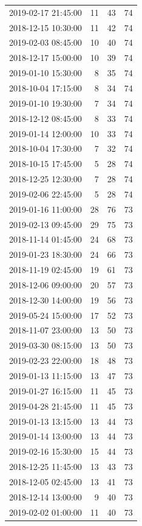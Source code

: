 \begin{tabular}{lrrr}
2019-02-17 21:45:00 & 11 & 43 & 74 \\
2018-12-15 10:30:00 & 11 & 42 & 74 \\
2019-02-03 08:45:00 & 10 & 40 & 74 \\
2018-12-17 15:00:00 & 10 & 39 & 74 \\
2019-01-10 15:30:00 & 8 & 35 & 74 \\
2018-10-04 17:15:00 & 8 & 34 & 74 \\
2019-01-10 19:30:00 & 7 & 34 & 74 \\
2018-12-12 08:45:00 & 8 & 33 & 74 \\
2019-01-14 12:00:00 & 10 & 33 & 74 \\
2018-10-04 17:30:00 & 7 & 32 & 74 \\
2018-10-15 17:45:00 & 5 & 28 & 74 \\
2018-12-25 12:30:00 & 7 & 28 & 74 \\
2019-02-06 22:45:00 & 5 & 28 & 74 \\
2019-01-16 11:00:00 & 28 & 76 & 73 \\
2019-02-13 09:45:00 & 29 & 75 & 73 \\
2018-11-14 01:45:00 & 24 & 68 & 73 \\
2019-01-23 18:30:00 & 24 & 66 & 73 \\
2018-11-19 02:45:00 & 19 & 61 & 73 \\
2018-12-06 09:00:00 & 20 & 57 & 73 \\
2018-12-30 14:00:00 & 19 & 56 & 73 \\
2019-05-24 15:00:00 & 17 & 52 & 73 \\
2018-11-07 23:00:00 & 13 & 50 & 73 \\
2019-03-30 08:15:00 & 13 & 50 & 73 \\
2019-02-23 22:00:00 & 18 & 48 & 73 \\
2019-01-13 11:15:00 & 13 & 47 & 73 \\
2019-01-27 16:15:00 & 11 & 45 & 73 \\
2019-04-28 21:45:00 & 11 & 45 & 73 \\
2019-01-13 13:15:00 & 13 & 44 & 73 \\
2019-01-14 13:00:00 & 13 & 44 & 73 \\
2019-02-16 15:30:00 & 15 & 44 & 73 \\
2018-12-25 11:45:00 & 13 & 43 & 73 \\
2018-12-05 02:45:00 & 13 & 41 & 73 \\
2018-12-14 13:00:00 & 9 & 40 & 73 \\
2019-02-02 01:00:00 & 11 & 40 & 73 \\

\end{tabular}

